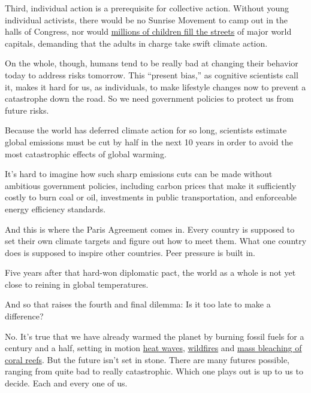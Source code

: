 Third, individual action is a prerequisite for collective action.
Without young individual activists, there would be no Sunrise Movement
to camp out in the halls of Congress, nor would
\href{https://www.nytimes3xbfgragh.onion/2019/09/20/climate/global-climate-strike.html}{millions
of children fill the streets} of major world capitals, demanding that
the adults in charge take swift climate action.

On the whole, though, humans tend to be really bad at changing their
behavior today to address risks tomorrow. This ``present bias,'' as
cognitive scientists call it, makes it hard for us, as individuals, to
make lifestyle changes now to prevent a catastrophe down the road. So we
need government policies to protect us from future risks.

Because the world has deferred climate action for so long, scientists
estimate global emissions must be cut by half in the next 10 years in
order to avoid the most catastrophic effects of global warming.

It's hard to imagine how such sharp emissions cuts can be made without
ambitious government policies, including carbon prices that make it
sufficiently costly to burn coal or oil, investments in public
transportation, and enforceable energy efficiency standards.

And this is where the Paris Agreement comes in. Every country is
supposed to set their own climate targets and figure out how to meet
them. What one country does is supposed to inspire other countries. Peer
pressure is built in.

Five years after that hard-won diplomatic pact, the world as a whole is
not yet close to reining in global temperatures.

And so that raises the fourth and final dilemma: Is it too late to make
a difference?

No. It's true that we have already warmed the planet by burning fossil
fuels for a century and a half, setting in motion
\href{https://www.nytimes3xbfgragh.onion/2019/07/01/climate/europe-heat-wave.html}{heat
waves},
\href{https://www.nytimes3xbfgragh.onion/2019/10/24/climate/california-wildfires-climate-change.html}{wildfires}
and
\href{https://www.nytimes3xbfgragh.onion/2020/04/06/world/australia/great-barrier-reefs-bleaching-dying.html}{mass
bleaching of coral reefs}. But the future isn't set in stone. There are
many futures possible, ranging from quite bad to really catastrophic.
Which one plays out is up to us to decide. Each and every one of us.

